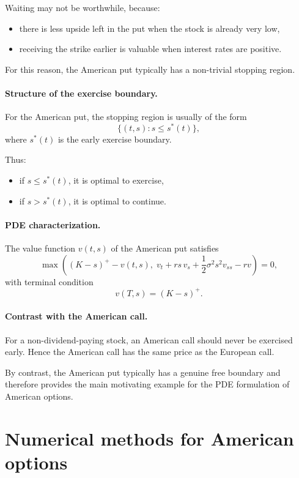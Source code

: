 \documentclass[11pt]{article}
\theoremstyle{definition}
\theoremstyle{plain}
\begin{document}
Waiting may not be worthwhile, because:
\begin{itemize}[leftmargin=1.4em]
    \item there is less upside left in the put when the stock is already very low,
    \item receiving the strike earlier is valuable when interest rates are positive.
\end{itemize}

For this reason, the American put typically has a non-trivial stopping region.

\paragraph{Structure of the exercise boundary.}
For the American put, the stopping region is usually of the form
\[
\{(t,s): s\le s^*(t)\},
\]
where \(s^*(t)\) is the early exercise boundary.

Thus:
\begin{itemize}[leftmargin=1.4em]
    \item if \(s\le s^*(t)\), it is optimal to exercise,
    \item if \(s>s^*(t)\), it is optimal to continue.
\end{itemize}

\paragraph{PDE characterization.}
The value function \(v(t,s)\) of the American put satisfies
\[
\max\!\left(
(K-s)^+-v(t,s),\;
v_t + rs\,v_s + \frac12 \sigma^2 s^2 v_{ss} - r v
\right)=0,
\]
with terminal condition
\[
v(T,s)=(K-s)^+.
\]

\paragraph{Contrast with the American call.}
For a non-dividend-paying stock, an American call should never be
exercised early.
Hence the American call has the same price as the European call.

By contrast, the American put typically has a genuine free boundary and
therefore provides the main motivating example for the PDE formulation
of American options.


\section{Numerical methods for American options}
\end{document}
